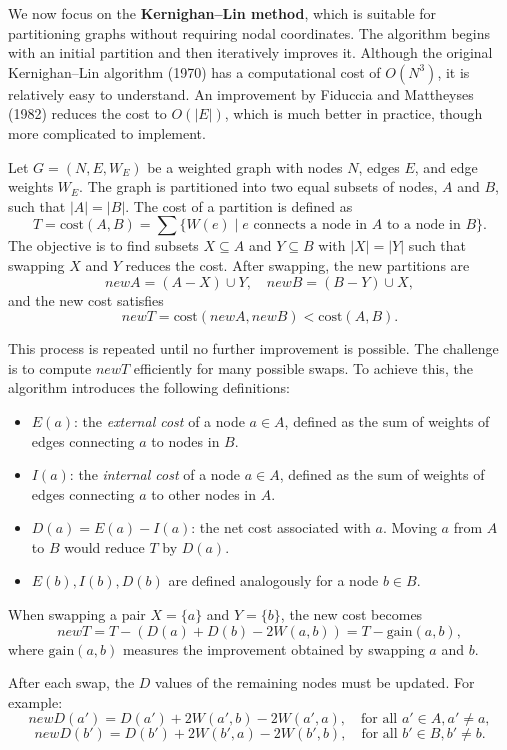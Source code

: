 \documentclass[12pt]{book}
\begin{document}
We now focus on the \textbf{Kernighan–Lin method}, which is suitable for partitioning graphs without requiring nodal coordinates. The algorithm begins with an initial partition and then iteratively improves it. Although the original Kernighan–Lin algorithm (1970) has a computational cost of $O(N^3)$, it is relatively easy to understand. An improvement by Fiduccia and Mattheyses (1982) reduces the cost to $O(|E|)$, which is much better in practice, though more complicated to implement.

Let $G=(N,E,W_E)$ be a weighted graph with nodes $N$, edges $E$, and edge weights $W_E$. The graph is partitioned into two equal subsets of nodes, $A$ and $B$, such that $|A|=|B|$. The cost of a partition is defined as
\[
T = \text{cost}(A,B) = \sum \{ W(e) \mid e \text{ connects a node in $A$ to a node in $B$} \}.
\]
The objective is to find subsets $X \subseteq A$ and $Y \subseteq B$ with $|X|=|Y|$ such that swapping $X$ and $Y$ reduces the cost. After swapping, the new partitions are
\[
newA = (A - X) \cup Y, \quad newB = (B - Y) \cup X,
\]
and the new cost satisfies
\[
newT = \text{cost}(newA, newB) < \text{cost}(A,B).
\]

This process is repeated until no further improvement is possible. The challenge is to compute $newT$ efficiently for many possible swaps. To achieve this, the algorithm introduces the following definitions:
\begin{itemize}
    \item $E(a)$: the \emph{external cost} of a node $a \in A$, defined as the sum of weights of edges connecting $a$ to nodes in $B$.
    \item $I(a)$: the \emph{internal cost} of a node $a \in A$, defined as the sum of weights of edges connecting $a$ to other nodes in $A$.
    \item $D(a) = E(a) - I(a)$: the net cost associated with $a$. Moving $a$ from $A$ to $B$ would reduce $T$ by $D(a)$.
    \item $E(b), I(b), D(b)$ are defined analogously for a node $b \in B$.
\end{itemize}

When swapping a pair $X=\{a\}$ and $Y=\{b\}$, the new cost becomes
\[
newT = T - (D(a) + D(b) - 2W(a,b)) = T - \text{gain}(a,b),
\]
where $\text{gain}(a,b)$ measures the improvement obtained by swapping $a$ and $b$.  

After each swap, the $D$ values of the remaining nodes must be updated. For example:
\[
newD(a') = D(a') + 2W(a',b) - 2W(a',a), \quad \text{for all $a' \in A, a' \neq a$},
\]
\[
newD(b') = D(b') + 2W(b',a) - 2W(b',b), \quad \text{for all $b' \in B, b' \neq b$}.
\]
\end{document}
